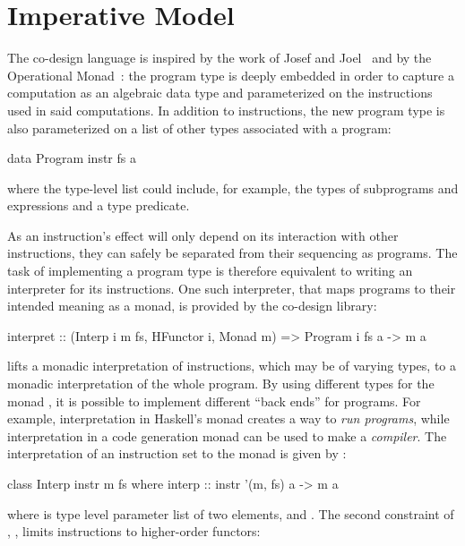 \documentclass[../paper.tex]{subfiles}
\begin{document}
\section{Imperative Model}
\label{instr}

The co-design language is inspired by the work of Josef and Joel~\cite{BjornBenny} and by the Operational Monad~\cite{Operational}: the program type is deeply embedded in order to capture a computation as an algebraic data type and parameterized on the instructions used in said computations. In addition to instructions, the new program type is also parameterized on a list of other types associated with a program:

\begin{code}
data Program instr fs a
\end{code}

\noindent where the type-level list  could include, for example, the types of subprograms and expressions and a type predicate.

As an instruction's effect will only depend on its interaction with other instructions, they can safely be separated from their sequencing as programs. The task of implementing a program type is therefore equivalent to writing an interpreter for its instructions. One such interpreter, that maps programs to their intended meaning as a monad, is provided by the co-design library:

\begin{code}
interpret :: (Interp i m fs, HFunctor i, Monad m) => Program i fs a -> m a
\end{code}

 lifts a monadic interpretation of instructions, which may be of varying types, to a monadic interpretation of the whole program. By using different types for the monad , it is possible to implement different ``back ends'' for programs. For example, interpretation in Haskell's  monad creates a way to \emph{run programs}, while interpretation in a code generation monad can be used to make a \emph{compiler}. The interpretation of an instruction set  to the monad  is given by :

\begin{code}
class Interp instr m fs where
  interp :: instr '(m, fs) a -> m a
\end{code}

\noindent where  is type level parameter list of two elements,  and . The second constraint of , , limits instructions to higher-order functors:
\end{document}
